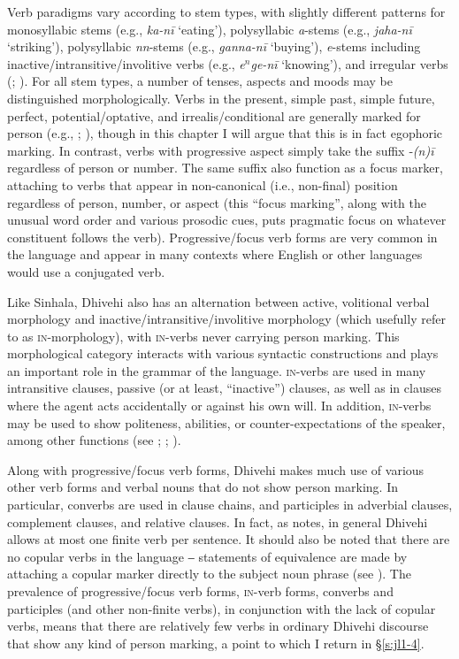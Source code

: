\documentclass[output=paper]{langsci/langscibook}
\begin{document}
Verb paradigms vary according to stem types, with slightly different patterns for monosyllabic stems (e.g., \textit{ka-nī} ‘eating’), polysyllabic \textit{a}-stems (e.g., \textit{jaha-nī} ‘striking’), polysyllabic \textit{nn}-stems (e.g., \textit{ganna-nī} ‘buying’), \textit{e}-stems including inactive/intransitive/involitive verbs (e.g., \textit{e$^n$ge-nī} ‘knowing’), and irregular verbs (\citealt[22--25]{CainGair2000}; \citealt[136--146]{Gnanadesikan2017}). For all stem types, a number of tenses, aspects and moods may be distinguished morphologically. Verbs in the present, simple past, simple future, perfect, potential/optative, and irrealis/conditional are generally marked for person (e.g., \citealt[23--27]{CainGair2000}; \citealt[Chapter 8]{Gnanadesikan2017}), though in this chapter I will argue that this is in fact egophoric marking. In contrast, verbs with progressive aspect simply take the suffix ‑\textit{(n)ī} regardless of person or number. The same suffix also function as a focus marker, attaching to verbs that appear in non-canonical (i.e., non-final) position regardless of person, number, or aspect (this “focus marking”, along with the unusual word order and various prosodic cues, puts pragmatic focus on whatever constituent follows the verb). Progressive/focus verb forms are very common in the language and appear in many contexts where English or other languages would use a conjugated verb. 

Like Sinhala, Dhivehi also has an alternation between active, volitional verbal morphology and inactive/intransitive/involitive morphology (which \citealt{CainGair2000} usefully refer to as \textsc{in}-morphology), with \textsc{in}-verbs never carrying person marking. This morphological category interacts with various syntactic constructions and plays an important role in the grammar of the language. \textsc{in}-verbs are used in many intransitive clauses, passive (or at least, “inactive”) clauses, as well as in clauses where the agent acts accidentally or against his own will. In addition, \textsc{in}-verbs may be used to show politeness, abilities, or counter-expectations of the speaker, among other functions (see \citealt{Cain1995}; \citealt[56--60]{CainGair2000}; \citealt[248--257]{Gnanadesikan2017}).

Along with progressive/focus verb forms, Dhivehi makes much use of various other verb forms and verbal nouns that do not show person marking. In particular, converbs are used in clause chains, and participles in adverbial clauses, complement clauses, and relative clauses. In fact, as \cite[289]{Gnanadesikan2017} notes, in general Dhivehi allows at most one finite verb per sentence. It should also be noted that there are no copular verbs in the language ‒ statements of equivalence are made by attaching a copular marker directly to the subject noun phrase (see \citealt[236--237]{Gnanadesikan2017}). The prevalence of progressive/focus verb forms, \textsc{in}-verb forms, converbs and participles (and other non-finite verbs), in conjunction with the lack of copular verbs, means that there are relatively few verbs in ordinary Dhivehi discourse that show any kind of person marking, a point to which I return in §\ref{s:jl1-4}.
\end{document}
